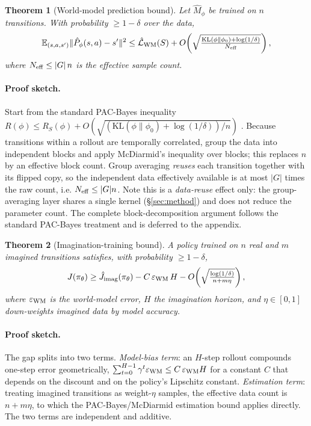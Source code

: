 \documentclass[preprint,12pt]{elsarticle}
\newtheorem{theorem}{Theorem}
\begin{document}
\begin{theorem}[World-model prediction bound]\label{th:wm}
Let $\hat M_\phi$ be trained on $n$ transitions. With probability
$\ge1-\delta$ over the data,
\[
  \mathbb E_{(s,a,s')}\|\hat P_\phi(s,a)-s'\|^2
  \le \hat{\mathcal L}_{\rm WM}(S)+
  O\!\left(\sqrt{\tfrac{\mathrm{KL}(\phi\|\phi_0)+\log(1/\delta)}{N_{\rm eff}}}\right),
\]
where $N_{\rm eff}\le |G|\,n$ is the effective sample count.
\end{theorem}

\paragraph{Proof sketch.}
Start from the standard PAC-Bayes inequality
$R(\phi)\le R_S(\phi)+O(\sqrt{(\mathrm{KL}(\phi\|\phi_0)+\log(1/\delta))/n})$
\cite{mcallester1999}. Because transitions within a rollout are temporally
correlated, group the data into independent blocks and apply
McDiarmid's inequality over blocks; this replaces $n$ by an effective block
count. Group averaging \emph{reuses} each transition together with its
flipped copy, so the independent data effectively available is at most
$|G|$ times the raw count, i.e. $N_{\rm eff}\le |G|n$. Note this is a
\emph{data-reuse} effect only: the group-averaging layer shares a single
kernel (\S\ref{sec:method}) and does not reduce the parameter count. The
complete block-decomposition argument follows the standard PAC-Bayes
treatment and is deferred to the appendix.

\begin{theorem}[Imagination-training bound]\label{th:imag}
A policy trained on $n$ real and $m$ imagined transitions satisfies, with
probability $\ge1-\delta$,
\[
  J(\pi_\theta)\ge \hat J_{\rm imag}(\pi_\theta)
  -C\,\varepsilon_{\rm WM}\,H
  -O\!\left(\sqrt{\tfrac{\log(1/\delta)}{n+m\eta}}\right),
\]
where $\varepsilon_{\rm WM}$ is the world-model error, $H$ the imagination
horizon, and $\eta\in[0,1]$ down-weights imagined data by model accuracy.
\end{theorem}

\paragraph{Proof sketch.}
The gap splits into two terms. \emph{Model-bias term}: an $H$-step rollout
compounds one-step error geometrically,
$\sum_{t=0}^{H-1}\gamma^t\varepsilon_{\rm WM}\le C\,\varepsilon_{\rm WM}H$
for a constant $C$ that depends on the discount and on the policy's Lipschitz
constant. \emph{Estimation term}: treating imagined transitions as
weight-$\eta$ samples, the effective data count is $n+m\eta$, to which the
PAC-Bayes/McDiarmid estimation bound applies directly. The two terms are
independent and additive.
\end{document}
